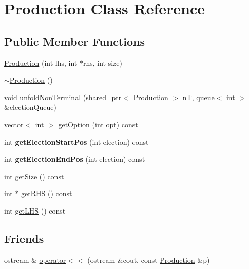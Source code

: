 \hypertarget{classProduction}{\section{Production Class Reference}
\label{classProduction}
}
\subsection*{Public Member Functions}
\begin{DoxyCompactItemize}
\item 
\hyperlink{classProduction_a92f0f1d1dbb5c68af2d6f8c89844d4ff}{Production} (int lhs, int $\ast$rhs, int size)
\item 
\hyperlink{classProduction_ab5b3060f9e0a2bc189844e426d693dab}{$\sim$\-Production} ()
\item 
void \hyperlink{classProduction_a4038d894f79a5a86c86a9c1d66040413}{unfold\-Non\-Terminal} (shared\-\_\-ptr$<$ \hyperlink{classProduction}{Production} $>$ n\-T, queue$<$ int $>$ \&election\-Queue)
\item 
vector$<$ int $>$ \hyperlink{classProduction_a5990c3ec3c934f4495bb6bb858584921}{get\-Option} (int opt) const 
\item 
\hypertarget{classProduction_aab0440acaa257a40d134a2158d5df777}{int {\bfseries get\-Election\-Start\-Pos} (int election) const }\label{classProduction_aab0440acaa257a40d134a2158d5df777}

\item 
\hypertarget{classProduction_a93f8128c95b20f4f59cbc817efb9d301}{int {\bfseries get\-Election\-End\-Pos} (int election) const }\label{classProduction_a93f8128c95b20f4f59cbc817efb9d301}

\item 
int \hyperlink{classProduction_a93ac262e02b0ccbb1947a00ee4781cb6}{get\-Size} () const 
\item 
int $\ast$ \hyperlink{classProduction_a31a72db90489bc566a819ef360cf23f0}{get\-R\-H\-S} () const 
\item 
int \hyperlink{classProduction_ab2dbdb2d626870e8b8f8a655f0d2f17a}{get\-L\-H\-S} () const 
\end{DoxyCompactItemize}
\subsection*{Friends}
\begin{DoxyCompactItemize}
\item 
ostream \& \hyperlink{classProduction_ad80a14935ba04d26e9067e3c388002d7}{operator$<$$<$} (ostream \&cout, const \hyperlink{classProduction}{Production} \&p)
\end{DoxyCompactItemize}


